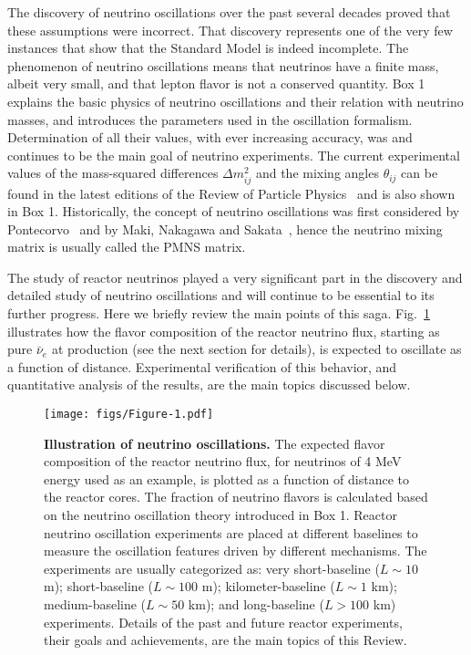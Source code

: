 \documentclass[aps,twocolumn,preprintnumbers,amsmath,superscriptaddress,amssymb,floats,nofootinbib]{revtex4-1}
\begin{document}
The discovery of neutrino oscillations over the past several decades
proved that these assumptions were incorrect. That discovery
represents one of the very few instances that show that
the Standard Model is indeed incomplete.
The phenomenon of neutrino oscillations means that
neutrinos have a finite mass, albeit very small, and that lepton flavor is not a conserved quantity.
Box 1 explains the basic physics of neutrino oscillations and their relation with neutrino masses, and introduces the parameters used in the oscillation formalism. Determination of all their values,
with ever increasing accuracy,
was and continues to be the main goal of neutrino experiments.
The current experimental values of the mass-squared differences $\Delta m^2_{ij}$ and the mixing angles $\theta_{ij}$ can be found
in the latest editions of the Review of Particle Physics~\cite{PDG14} and is also shown in Box 1.
Historically, the concept of neutrino oscillations was first considered by Pontecorvo~\cite{Pontecorvo57, Pontecorvo58}
and by Maki, Nakagawa and Sakata~\cite{MNS62}, hence the neutrino mixing matrix is usually called the PMNS matrix.

The study of reactor neutrinos played a very significant part in the discovery and detailed study of neutrino oscillations and will continue
to be essential to its further progress. Here we briefly review
the main points of this saga. Fig.~\ref{fig:intro1} illustrates how the flavor composition of the reactor neutrino flux, starting as pure $\bar\nu_e$ at production (see the next section for details), is expected to oscillate as a function of distance.
Experimental verification of this behavior, and quantitative analysis of the results, are the main topics discussed below.

\begin{figure}[tb]
\begin{centering}
\texttt{[image: figs/Figure-1.pdf]}
\par\end{centering}
\caption{\label{fig:intro1} {\bf Illustration of neutrino oscillations.} The expected flavor composition of the reactor neutrino flux, for neutrinos of 4 MeV energy
used as an example, is plotted as a function of distance to the reactor cores. The fraction of neutrino flavors is calculated based on the neutrino oscillation theory introduced in Box 1. Reactor neutrino oscillation experiments are placed at different baselines to measure the oscillation features driven by different mechanisms. The experiments are usually categorized as: very short-baseline ($L\sim10$ m); short-baseline ($L\sim100$ m); kilometer-baseline ($L\sim1$ km); medium-baseline ($L\sim50$ km); and long-baseline ($L>100$ km) experiments. Details of the past and future reactor experiments, their goals and achievements, are the main topics of this Review.
}
\end{figure}
\end{document}
